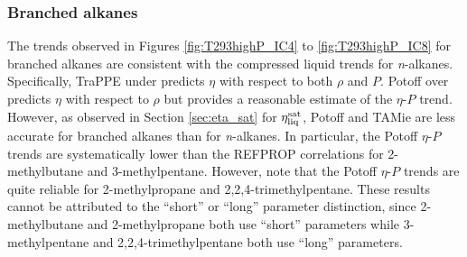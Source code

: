 \documentclass[preprint,review,12pt]{elsarticle}
\begin{document}
	
	
	\subsubsection{Branched alkanes}
	
	
	
   The trends observed in Figures \ref{fig:T293highP_IC4} to \ref{fig:T293highP_IC8} for branched alkanes are consistent with the compressed liquid trends for \textit{n}-alkanes. Specifically, TraPPE under predicts $\eta$ with respect to both $\rho$ and $P$. Potoff over predicts $\eta$ with respect to $\rho$ but provides a reasonable estimate of the $\eta$-$P$ trend. However, as observed in Section \ref{sec:eta_sat} for $\eta_{\rm liq}^{\rm sat}$, Potoff and TAMie are less accurate for branched alkanes than for \textit{n}-alkanes. In particular, the Potoff $\eta$-$P$ trends are systematically lower than the REFPROP correlations for 2-methylbutane and 3-methylpentane. However, note that the Potoff $\eta$-$P$ trends are quite reliable for 2-methylpropane and 2,2,4-trimethylpentane. These results cannot be attributed to the ``short'' or ``long'' parameter distinction, since 2-methylbutane and 2-methylpropane both use ``short'' parameters while 3-methylpentane and 2,2,4-trimethylpentane both use ``long'' parameters. 
	
\end{document}

